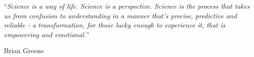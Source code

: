 \documentclass[
11pt, %
english, %
onehalfspacing %
]{MastersDoctoralThesis} %
\begin{document}
%

\noindent\enquote{\itshape Science is a way of life. Science is a perspective. Science is the process that takes us from confusion to understanding in a manner that's precise, predictive and reliable - a transformation, for those lucky enough to experience it, that is empowering and emotional.}\bigbreak

\hfill Brian Greene


\begin{abstract}
\addchaptertocentry{\abstractname} %



\end{abstract}


\begin{resum}
\addchaptertocentry{\resumname} %



\end{resum}


\begin{acknowledgements}
\addchaptertocentry{\acknowledgementname} %



\end{acknowledgements}
\end{document}
